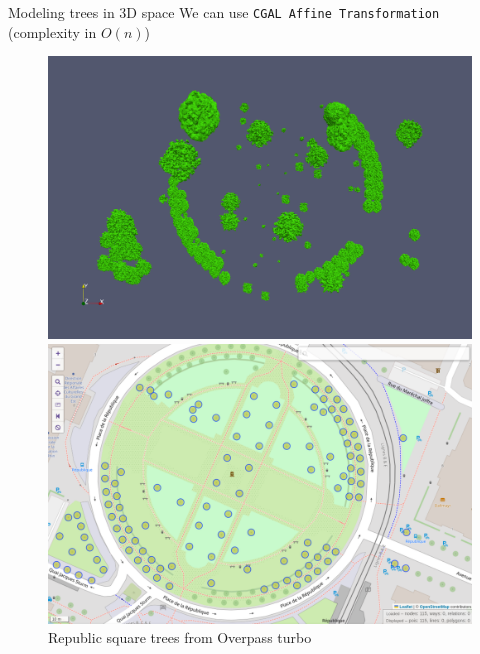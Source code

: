 \documentclass[12pt]{beamer}
\begin{document}
\begin{frame}{Modeling trees in 3D space}
We can use \texttt{CGAL Affine Transformation} 
(complexity in $O(n)$)

\begin{figure}[H]
  \centering
  \begin{minipage}{0.49\textwidth}
      \centering
      \includegraphics[width=1\textwidth]{images/republic_lod3.png}
      \caption{Republic square with LOD 3 trees.}
  \end{minipage}\hfill
  \begin{minipage}{0.49\textwidth}
      \centering
      \includegraphics[width=1\textwidth]{images/republic_overpassturbo.png}
      \caption{Republic square trees from Overpass turbo}
  \end{minipage}
\end{figure}
\end{frame}
\end{document}
